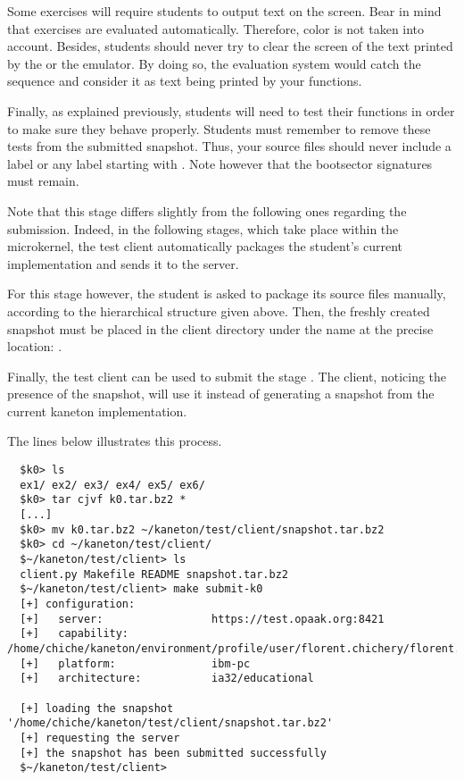 Some exercises will require students to output text on the screen. Bear in
mind that exercises are evaluated automatically. Therefore, color is not
taken into account. Besides, students should never try to clear the screen
of the text printed by the  or the emulator. By doing so, the
evaluation system would catch the sequence and consider it as text being
printed by your functions.

Finally, as explained previously, students will need to test their functions
in order to make sure they behave properly. Students must remember to remove
these tests from the submitted snapshot. Thus, your source files should never
include a label  or any label starting with \code{\_\_}. Note
however that the bootsector signatures must remain.

Note that this stage differs slightly from the following ones regarding
the submission. Indeed, in the following stages, which take place within the
microkernel, the test client automatically packages the student's current
implementation and sends it to the server.

For this stage however, the student is asked to package its source files
manually, according to the hierarchical structure given above. Then,
the freshly created snapshot must be placed in the client directory
under the name  \ie{} at the precise location:
.

Finally, the test client can be used to submit the stage . The
client, noticing the presence of the snapshot, will use it instead of
generating a snapshot from the current kaneton implementation.

The lines below illustrates this process.

\begin{verbatim}
  $k0> ls
  ex1/ ex2/ ex3/ ex4/ ex5/ ex6/
  $k0> tar cjvf k0.tar.bz2 *
  [...]
  $k0> mv k0.tar.bz2 ~/kaneton/test/client/snapshot.tar.bz2
  $k0> cd ~/kaneton/test/client/
  $~/kaneton/test/client> ls
  client.py Makefile README snapshot.tar.bz2
  $~/kaneton/test/client> make submit-k0
  [+] configuration:
  [+]   server:                 https://test.opaak.org:8421
  [+]   capability:             /home/chiche/kaneton/environment/profile/user/florent.chichery/florent.chichery.cap
  [+]   platform:               ibm-pc
  [+]   architecture:           ia32/educational

  [+] loading the snapshot '/home/chiche/kaneton/test/client/snapshot.tar.bz2'
  [+] requesting the server
  [+] the snapshot has been submitted successfully
  $~/kaneton/test/client>
\end{verbatim}

